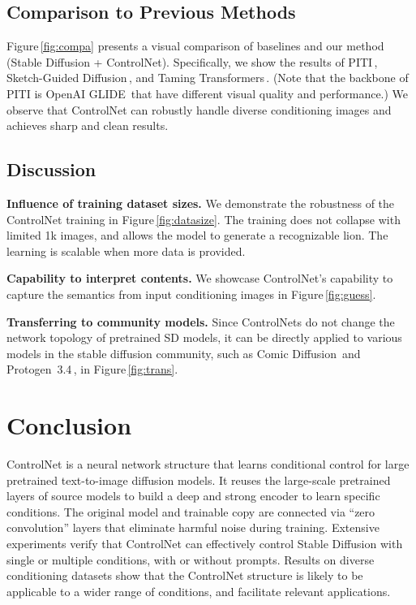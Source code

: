 	\subsection{Comparison to Previous Methods}
	Figure\,\ref{fig:compa} presents a visual comparison of baselines and our method (Stable Diffusion + ControlNet). Specifically, we show the results of PITI\,\cite{wang2022pretraining}, Sketch-Guided Diffusion\,\cite{voynov2022sketch}, and Taming Transformers\,\cite{esser2021taming}. (Note that the backbone of PITI is OpenAI GLIDE\,\cite{glide} that have different visual quality and performance.) We observe that ControlNet can robustly handle diverse conditioning images and achieves sharp and clean results.

	\subsection{Discussion}

	\textbf{Influence of training dataset sizes.} We demonstrate the robustness of the ControlNet training in Figure\,\ref{fig:datasize}.
	The training does not collapse with limited 1k images, and allows the model to generate a recognizable lion. The learning is scalable when more data is provided.

	\textbf{Capability to interpret contents.} We showcase ControlNet's capability to capture the semantics from input conditioning images in Figure\,\ref{fig:guess}.

	\textbf{Transferring to community models.} Since ControlNets do not change the network topology of pretrained SD models, it can be directly applied to various models in the stable diffusion community, such as Comic Diffusion\,\cite{comicdiff} and Protogen~3.4\,\cite{protogen}, in Figure\,\ref{fig:trans}. 

	\section{Conclusion}
	\label{sec:conclusion}

	ControlNet is a neural network structure that learns conditional control for large pretrained text-to-image diffusion models. It reuses the large-scale pretrained layers of source models to build a deep and strong encoder to learn specific conditions. The original model and trainable copy are connected via ``zero convolution'' layers that eliminate harmful noise during training.  Extensive experiments verify that ControlNet can effectively control Stable Diffusion with single or multiple conditions, with or without prompts. Results on diverse conditioning datasets show that the ControlNet structure is likely to be applicable to a wider range of conditions, and facilitate relevant applications.


